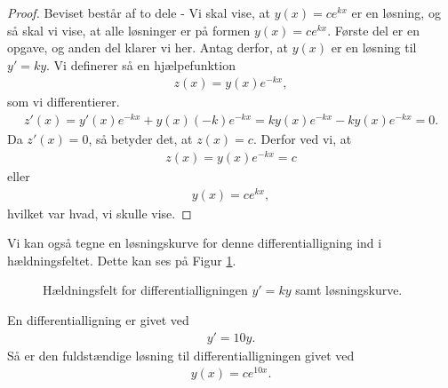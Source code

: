 \begin{proof}
	Beviset består af to dele - Vi skal vise, at $y(x) = ce^{kx}$ er en løsning, og så skal vi vise, at alle løsninger er på formen $y(x) = ce^{kx}$. Første del er en opgave,
	og anden del klarer vi her. 
	Antag derfor, at $y(x)$ er en løsning til $y' = ky$. Vi definerer så en hjælpefunktion
	\begin{align*}
		z(x) = y(x)e^{-kx},
	\end{align*}
	som vi differentierer.
	\begin{align*}
		z'(x) = y'(x)e^{-kx}+y(x)(-k)e^{-kx} = ky(x)e^{-kx}-ky(x)e^{-kx}=0.
	\end{align*}
	Da $z'(x)=0$, så betyder det, at $z(x) = c$. Derfor ved vi, at
	\begin{align*}
		z(x) = y(x)e^{-kx} = c
	\end{align*}
	eller 
	\begin{align*}
		y(x) = ce^{kx},
	\end{align*}
	hvilket var hvad, vi skulle vise. 		 
\end{proof}
Vi kan også tegne en løsningskurve for denne differentialligning ind i hældningsfeltet. Dette kan ses på Figur \ref{fig:eksphældkurve}.
\begin{figure}[H]
	\centering
	\caption{Hældningsfelt for differentialligningen $y' = ky$ samt løsningskurve.}
	\label{fig:eksphældkurve}
\end{figure}
\begin{exa}
	En differentialligning er givet ved 
	\begin{align*}
		y' = 10y.
	\end{align*}
	Så er den fuldstændige løsning til differentialligningen givet ved
	\begin{align*}
		y(x) = ce^{10x}.
	\end{align*}
\end{exa}

